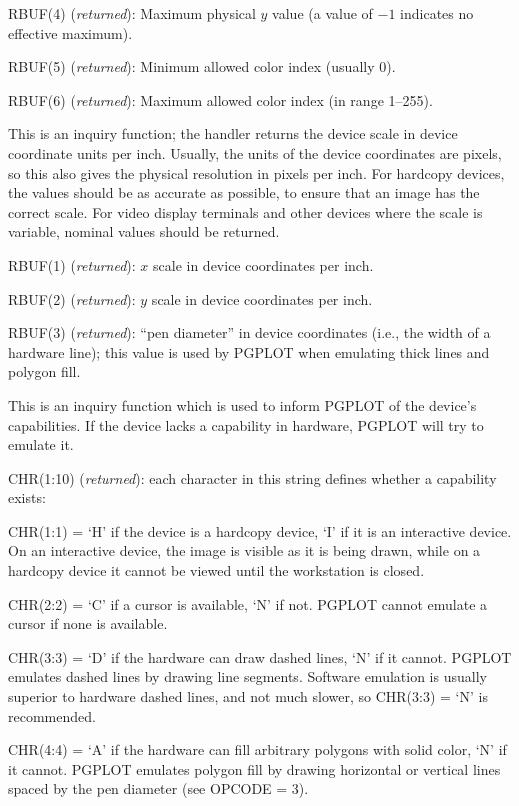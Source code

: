 RBUF(4) ({\it returned\/}): Maximum physical $y$ value
(a value of $-1$ indicates no effective maximum).

RBUF(5) ({\it returned\/}): Minimum allowed color index (usually 0).

RBUF(6)	({\it returned\/}): Maximum allowed color index (in range 1--255).


This is an inquiry function; the handler returns the device scale in 
device coordinate units per inch.
Usually, the units of the device coordinates are pixels, so this also 
gives the physical resolution in pixels per inch.
For hardcopy devices, the values should be as accurate as possible, to 
ensure that an image has the correct scale. For video display terminals 
and other devices where the scale is variable, nominal values should be 
returned.

RBUF(1) ({\it returned\/}): $x$ scale in device coordinates per inch.

RBUF(2) ({\it returned\/}): $y$ scale in device coordinates per inch.

RBUF(3) ({\it returned\/}): ``pen diameter'' in device coordinates (i.e., the 
width of a hardware line); this value is used by PGPLOT when emulating
thick lines and polygon fill. 


This is an inquiry function which is used to inform PGPLOT of the 
device's capabilities. If the device lacks a capability in hardware, 
PGPLOT will try to emulate it.

CHR(1:10) ({\it returned\/}): each character in this string defines whether a 
capability exists: 

CHR(1:1) = `H' if the device is a hardcopy device, `I' if it is an 
interactive device. On an interactive device, the image is visible as
it is being drawn, while on a hardcopy device it cannot be viewed until 
the workstation is closed.

CHR(2:2) = `C' if a cursor is available, `N' if not. PGPLOT cannot 
emulate a cursor if none is available.

CHR(3:3) = `D' if the hardware can draw dashed lines, `N' if it cannot. 
PGPLOT emulates dashed lines by drawing line segments. Software 
emulation is usually superior to hardware dashed lines, and not much 
slower, so CHR(3:3) = `N' is recommended.

CHR(4:4) = `A' if the hardware can fill arbitrary polygons with solid
color, `N' if it cannot. PGPLOT emulates polygon fill by drawing
horizontal or vertical lines spaced by the pen diameter (see OPCODE =
3). 

